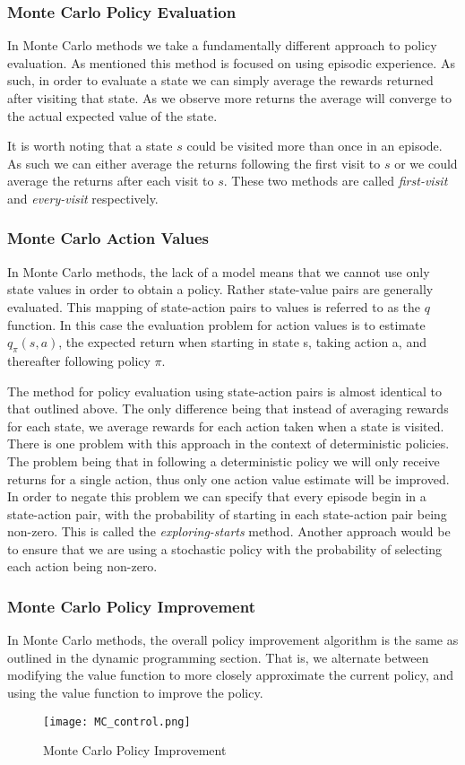 \subsubsection{Monte Carlo Policy Evaluation}
In Monte Carlo methods we take a fundamentally different approach to policy evaluation.
As mentioned this method is focused on using episodic experience.
As such, in order to evaluate a state we can simply average the rewards returned after visiting that state.
As we observe more returns the average will converge to the actual expected value of the state.

It is worth noting that a state $s$ could be visited more than once in an episode.
As such we can either average the returns following the first visit to $s$ or we could average the returns
after each visit to $s$.
These two methods are called \textit{first-visit} and \textit{every-visit} respectively.

\subsubsection{Monte Carlo Action Values}
In Monte Carlo methods, the lack of a model means that we cannot use only state values in order to
obtain a policy.
Rather state-value pairs are generally evaluated.
This mapping of state-action pairs to values is referred to as the $q$ function.
In this case the evaluation problem for action values is to estimate $q_\pi(s, a)$, the expected return when
starting in state s, taking action a, and thereafter following policy $\pi$\citep{sutton1998reinforcement}.

The method for policy evaluation using state-action pairs is almost identical to that outlined above.
The only difference being that instead of averaging rewards for each state, we average
rewards for each action taken when a state is visited.
There is one problem with this approach in the context of deterministic policies.
The problem being that in following a deterministic policy we will only receive returns
for a single action, thus only one action value estimate will be improved.
In order to negate this problem we can specify that every episode begin in a state-action pair,
with the probability of starting in each state-action pair being non-zero.
This is called the \textit{exploring-starts} method.
Another approach would be to ensure that we are using a stochastic policy with
the probability of selecting each action being non-zero.

\subsubsection{Monte Carlo Policy Improvement}
In Monte Carlo methods, the overall policy improvement algorithm is the same as outlined in the dynamic
programming section.
That is, we alternate between modifying the value function to more closely approximate the current policy,
and using the value function to improve the policy.
\begin{figure}[ht]
    \texttt{[image: MC\_control.png]}
    \caption{Monte Carlo Policy Improvement}
\end{figure}

